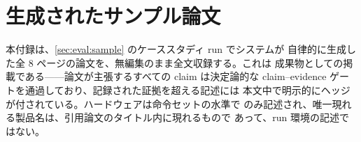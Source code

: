 \section{生成されたサンプル論文}\label{appendix:samplepaper}

本付録は、\cref{sec:eval:sample} のケーススタディ run でシステムが
自律的に生成した全 8 ページの論文を、無編集のまま全文収録する。これは
成果物としての掲載である——論文が主張するすべての claim は決定論的な
claim--evidence ゲートを通過しており、記録された証拠を超える記述には
本文中で明示的にヘッジが付されている。ハードウェアは命令セットの水準で
のみ記述され、唯一現れる製品名は、引用論文のタイトル内に現れるもので
あって、run 環境の記述ではない。


